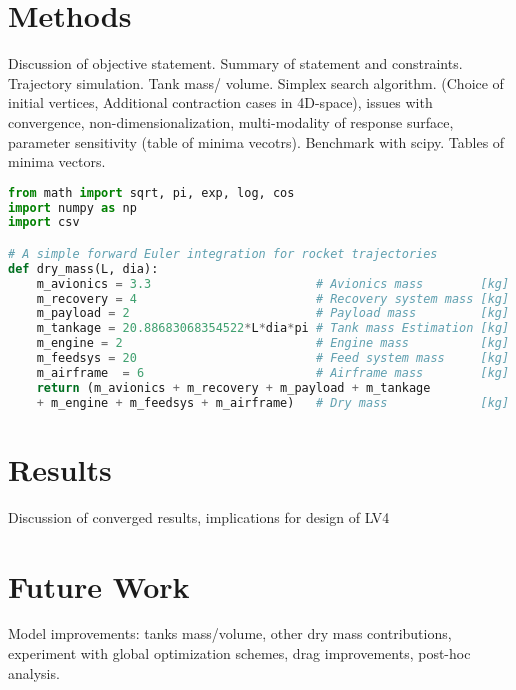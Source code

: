 \documentclass[]{aiaa-tc}%
\begin{document}
\section{Methods}
Discussion of objective statement. Summary of statement and constraints. Trajectory simulation. Tank mass/ volume. Simplex search algorithm. (Choice of initial vertices, Additional contraction cases in 4D-space), issues with convergence, non-dimensionalization, multi-modality of response surface, parameter sensitivity (table of minima vecotrs). Benchmark with scipy. Tables of minima vectors.

\begin{lstlisting}[language=Python]
from math import sqrt, pi, exp, log, cos
import numpy as np
import csv

# A simple forward Euler integration for rocket trajectories
def dry_mass(L, dia):
    m_avionics = 3.3                       # Avionics mass        [kg]
    m_recovery = 4                         # Recovery system mass [kg]
    m_payload = 2                          # Payload mass         [kg]
    m_tankage = 20.88683068354522*L*dia*pi # Tank mass Estimation [kg]
    m_engine = 2                           # Engine mass          [kg]
    m_feedsys = 20                         # Feed system mass     [kg]
    m_airframe  = 6                        # Airframe mass        [kg]
    return (m_avionics + m_recovery + m_payload + m_tankage 
    + m_engine + m_feedsys + m_airframe)   # Dry mass             [kg]
\end{lstlisting}


\section{Results}
Discussion of converged results, implications for design of LV4


\section{Future Work}
Model improvements: tanks mass/volume, other dry mass contributions, experiment with global optimization schemes, drag improvements, post-hoc analysis.
\end{document}
